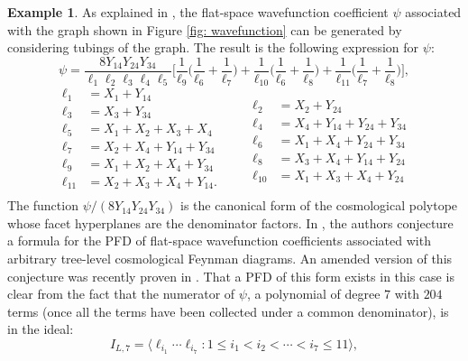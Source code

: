 \documentclass [a4paper,reqno, 11pt]{amsart}
\theoremstyle{plain}
\theoremstyle{plain}
\theoremstyle{plain}
\theoremstyle{plain}
\theoremstyle{definition}
\theoremstyle{definition}
\newtheorem{example}[theorem]{Example}
\theoremstyle{definition}
\theoremstyle{definition}
\theoremstyle{definition}
\theoremstyle{definition}
\begin{document}
\begin{example}
As explained in \cite{ABHJLP}, the flat-space wavefunction coefficient $\psi$ associated with the graph shown in Figure \ref{fig: wavefunction} can be generated by considering tubings of the graph. The result is the following expression for $\psi$:
\begin{equation*}
\psi=\frac{8 Y_{14}Y_{24}Y_{34}}{\ell_1\ell_2\ell_3\ell_4\ell_5}\bigg[\frac{1}{\ell_9}\bigg(\frac{1}{\ell_6}+\frac{1}{\ell_7}\bigg)+\frac{1}{\ell_{10}}\bigg(\frac{1}{\ell_6}+\frac{1}{\ell_8}\bigg)+\frac{1}{\ell_{11}}\bigg(\frac{1}{\ell_7}+\frac{1}{\ell_8}\bigg)\bigg],
\end{equation*}
\begin{equation*}
\begin{aligned}
    \ell_1&=X_1+Y_{14}\\
    \ell_3&=X_3+Y_{34}\\
    \ell_5&=X_1+X_2+X_3+X_4\\
    \ell_7&=X_2+X_4+Y_{14}+Y_{34}\\
    \ell_9&=X_1+X_2+X_4+Y_{34}\\
    \ell_{11}&=X_2+X_3+X_4+Y_{14}.\\
\end{aligned}
\quad\quad
\begin{aligned}
    \ell_2&=X_2+Y_{24}\\
    \ell_4&=X_4+Y_{14}+Y_{24}+Y_{34}\\
    \ell_6&=X_1+X_4+Y_{24}+Y_{34}\\
    \ell_8&=X_3+X_4+Y_{14}+Y_{24}\\
    \ell_{10}&=X_1+X_3+X_4+Y_{24}
\end{aligned}
\end{equation*}
The function $\psi/(8Y_{14}Y_{24}Y_{34})$ is the canonical form of the cosmological polytope whose facet hyperplanes are the denominator factors. In \cite{FPSW}, the authors conjecture a formula for the PFD of flat-space wavefunction coefficients associated with arbitrary tree-level cosmological Feynman diagrams. An amended version of this conjecture was recently proven in \cite{Dun}. That a PFD of this form exists in this case is clear from the fact that the numerator of $\psi$, a polynomial of degree $7$ with $204$ terms (once all the terms have been collected under a common denominator), is in the ideal:
\begin{equation*}
    I_{L,7}=\langle\ell_{i_1}\cdots\ell_{i_7}:1\le i_1<i_2<\cdots<i_7\le11\rangle,
\end{equation*}

\end{example}
\end{document}
